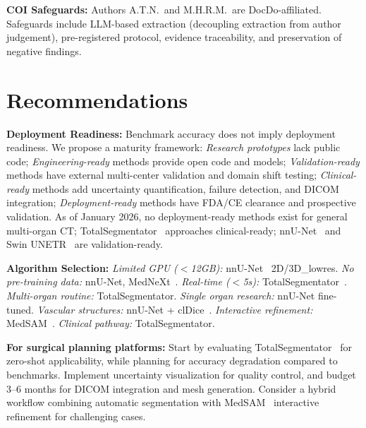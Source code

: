 \documentclass[conference]{IEEEtran}
\begin{document}
\textbf{COI Safeguards:} Authors A.T.N.\ and M.H.R.M.\ are DocDo-affiliated. Safeguards include LLM-based extraction (decoupling extraction from author judgement), pre-registered protocol, evidence traceability, and preservation of negative findings.

\section{Recommendations}
\label{sec:recommendations}

\textbf{Deployment Readiness:} Benchmark accuracy does not imply deployment readiness. We propose a maturity framework: \emph{Research prototypes} lack public code; \emph{Engineering-ready} methods provide open code and models; \emph{Validation-ready} methods have external multi-center validation and domain shift testing; \emph{Clinical-ready} methods add uncertainty quantification, failure detection, and DICOM integration; \emph{Deployment-ready} methods have FDA/CE clearance and prospective validation. As of January 2026, no deployment-ready methods exist for general multi-organ CT; TotalSegmentator~\cite{wasserthal2023totalsegmentator} approaches clinical-ready; nnU-Net~\cite{isensee2021nnunet} and Swin UNETR~\cite{swinunetr2022} are validation-ready.

\textbf{Algorithm Selection:} \emph{Limited GPU ($<$12GB):} nnU-Net~\cite{isensee2021nnunet} 2D/3D\_lowres. \emph{No pre-training data:} nnU-Net, MedNeXt~\cite{roy2023mednext}. \emph{Real-time ($<$5s):} TotalSegmentator~\cite{wasserthal2023totalsegmentator}. \emph{Multi-organ routine:} TotalSegmentator. \emph{Single organ research:} nnU-Net fine-tuned. \emph{Vascular structures:} nnU-Net + clDice~\cite{shit2021cldice}. \emph{Interactive refinement:} MedSAM~\cite{ma2024medsam}. \emph{Clinical pathway:} TotalSegmentator.

\textbf{For surgical planning platforms:} Start by evaluating TotalSegmentator~\cite{wasserthal2023totalsegmentator} for zero-shot applicability, while planning for accuracy degradation compared to benchmarks. Implement uncertainty visualization for quality control, and budget 3--6 months for DICOM integration and mesh generation. Consider a hybrid workflow combining automatic segmentation with MedSAM~\cite{ma2024medsam} interactive refinement for challenging cases.

\end{document}
